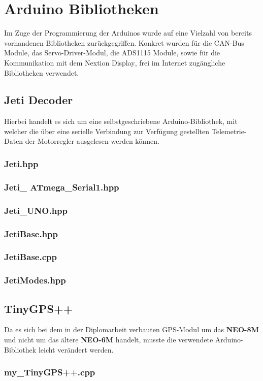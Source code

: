\section{Arduino Bibliotheken}
Im Zuge der Programmierung der Arduinos wurde auf eine Vielzahl von bereits vorhandenen Bibliotheken zurückgegriffen. Konkret wurden für die CAN-Bus Module\textsuperscript{\cite{ArduinoBibliothekCANBus}}, 
das Servo-Driver-Modul\textsuperscript{\cite{ArduinoBibliothekServoPWM}}, 
die ADS1115 Module\textsuperscript{\cite{ArduinoBibliothekADS1115}}, 
sowie für die Kommunikation mit dem Nextion Display\textsuperscript{\cite{ArduinoBibliothekNextion}}, frei im Internet zugängliche Bibliotheken verwendet.
\subsection{Jeti Decoder}
Hierbei handelt es sich um eine selbstgeschriebene Arduino-Bibliothek, mit welcher die über eine serielle Verbindung zur Verfügung gestellten Telemetrie-Daten der Motorregler ausgelesen werden können.
\subsubsection{Jeti.hpp}

\subsubsection{Jeti\_ ATmega\_Serial1.hpp}

\subsubsection{Jeti\_UNO.hpp}

\subsubsection{JetiBase.hpp}

\subsubsection{JetiBase.cpp}


\subsubsection{JetiModes.hpp}

\subsection{TinyGPS++}
Da es sich bei dem in der Diplomarbeit verbauten GPS-Modul um das \textbf{NEO-8M} 
und nicht um das ältere \textbf{NEO-6M} handelt, musste die verwendete Arduino-Bibliothek\textsuperscript{\cite{ArduinoBibliothekGPS}} leicht verändert werden.
\subsubsection{my\_TinyGPS++.cpp}
